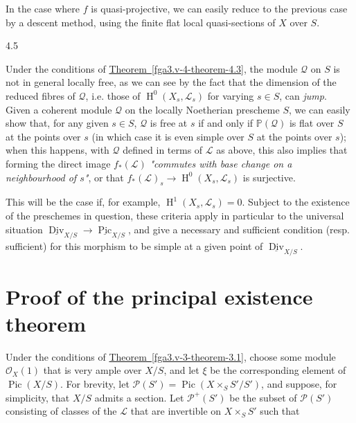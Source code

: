   In the case where \(f\) is quasi-projective, we can easily reduce to the previous case by a descent method, using the finite flat local quasi-sections of \(X\) over \(S\).\begin{remark}{4.5}\label{fga3.v-4-remark-4.5}\skipsinglepar\par{}Under the conditions of \hyperref[fga3.v-4-theorem-4.3]{Theorem~\ref*{fga3.v-4-theorem-4.3}}, the module \(\mathscr {Q}\) on \(S\) is not in general locally free, as we can see by the fact that the dimension of the reduced fibres of \(\mathscr {Q}\), i.e. those of \(\operatorname {H}^0(X_s,\mathscr {L}_s)\) for varying \(s\in  S\), can \emph{jump}.
    Given a coherent module \(\mathscr {Q}\) on the locally Noetherian prescheme \(S\), we can easily show that, for any given \(s\in  S\), \(\mathscr {Q}\) is free at \(s\) if and only if \(\mathbb {P}(\mathscr {Q})\) is flat over \(S\) at the points over \(s\) (in which case it is even simple over \(S\) at the points over \(s\));
    when this happens, with \(\mathscr {Q}\) defined in terms of \(\mathscr {L}\) as above, this also implies that forming the direct image \(f_*(\mathscr {L})\) \emph{"commutes with base change on a neighbourhood of \(s\)"}, or that \(f_*(\mathscr {L})_s\to \operatorname {H}^0(X_s,\mathscr {L}_s)\) is surjective.
    
    This will be the case if, for example, \(\operatorname {H}^1(X_s,\mathscr {L}_s)=0\).
    Subject to the existence of the preschemes in question, these criteria apply in particular to the universal situation \(\underline {\operatorname {Div}}_{X/S}\to \underline {\operatorname {Pic}}_{X/S}\), and give a necessary and sufficient condition (resp. sufficient) for this morphism to be simple at a given point of \(\underline {\operatorname {Div}}_{X/S}\).\end{remark}\chapter{Proof of the principal existence theorem}\thispagestyle{fancy}\label{fga3.v-5}\par{}Under the conditions of \hyperref[fga3.v-3-theorem-3.1]{Theorem~\ref*{fga3.v-3-theorem-3.1}}, choose some module \(\mathcal {O}_X(1)\) that is very ample over \(X/S\), and let \(\xi \) be the corresponding element of \(\operatorname {Pic}(X/S)\).
  For brevity, let \(\mathscr {P}(S')=\operatorname {Pic}(X\times _S S'/S')\), and suppose, for simplicity, that \(X/S\) admits a section.
  Let \(\mathscr {P}^+(S')\) be the subset of \(\mathscr {P}(S')\) consisting of classes of the \(\mathscr {L}\) that are invertible on \(X\times _S S'\) such that
